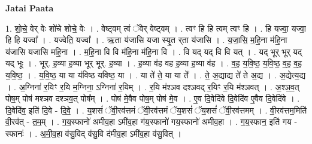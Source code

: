 \documentclass[17pt]{extarticle}
\begin{document}
\textbf{Jatai Paata} \newline

1. शो॒चे॒ वेर् वेः शो॑चे शोचे॒ वेः । . वेष्ट्वम् त्वं ॅवेर् वेष्ट्वम् । . त्वꣳ हि हि त्वम् त्वꣳ हि । . हि यज्वा॒ यज्वा॒ हि हि यज्वा᳚ । . यज्वेति॒ यज्वा᳚ । . ऋ॒ता य॑जासि यजा स्यृ॒त र्‌ता य॑जासि । . य॒जा॒सि॒ म॒हि॒ना म॑हि॒ना य॑जासि यजासि महि॒ना । . म॒हि॒ना वि वि म॑हि॒ना म॑हि॒ना वि । . वि यद् यद् वि वि यत् । . यद् भूर् भूर् यद् यद् भूः । . भूर्. ह॒व्या ह॒व्या भूर् भूर्. ह॒व्या । . ह॒व्या व॑ह वह ह॒व्या ह॒व्या व॑ह । . व॒ह॒ य॒वि॒ष्ठ॒ य॒वि॒ष्ठ॒ व॒ह॒ व॒ह॒ य॒वि॒ष्ठ॒ । . य॒वि॒ष्ठ॒ या या य॑विष्ठ यविष्ठ॒ या । . या ते॑ ते॒ या या ते᳚ । . ते॒ अ॒द्याद्य ते॑ ते अ॒द्य । . अ॒द्येत्य॒द्य । . अ॒ग्निना॑ र॒यिꣳ र॒यि म॒ग्निना॒ ऽग्निना॑ र॒यिम् । . र॒यि म॑श्ञव दश्ञवद् र॒यिꣳ र॒यि म॑श्ञवत् । . अ॒श्ञ॒व॒त् पोष॒म् पोष॑ मश्ञव दश्ञव॒त् पोष᳚म् । . पोष॑ मे॒वैव पोष॒म् पोष॑ मे॒व । . ए॒व दि॒वेदि॑वे दि॒वेदि॑व ए॒वैव दि॒वेदि॑वे । . दि॒वेदि॑व॒ इति॑ दि॒वे - दि॒वे॒ । . य॒शसं॑ ॅवी॒रव॑त्तमं ॅवी॒रव॑त्तमं ॅय॒शसं॑ ॅय॒शसं॑ ॅवी॒रव॑त्तमम् । . वी॒रव॑त्तम॒मिति॑ वी॒रव॑त् - त॒म॒म् । . ग॒य॒स्फानो॑ अमीव॒हा ऽमी॑व॒हा ग॑य॒स्फानो॑ गय॒स्फानो॑ अमीव॒हा । . ग॒य॒स्फान॒ इति॑ गय - स्फानः॑ । . अ॒मी॒व॒हा व॑सु॒विद् व॑सु॒वि द॑मीव॒हा ऽमी॑व॒हा व॑सु॒वित् । \newline
\end{document}
